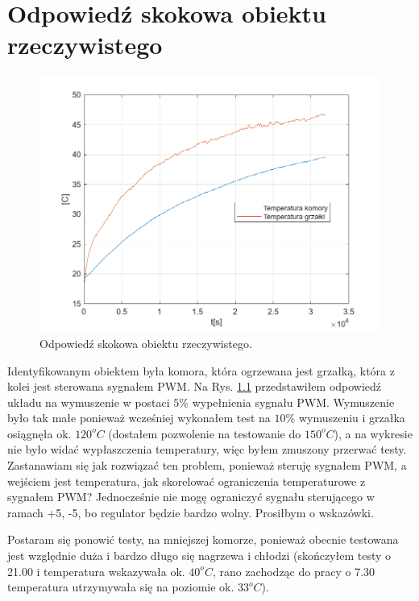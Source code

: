 \chapter{Odpowiedź skokowa obiektu rzeczywistego}

\begin{figure}[h!]
\centering
\includegraphics[width=\textwidth]{pictures/step_response}
\caption{Odpowiedź skokowa obiektu rzeczywistego.}
\label{step_response}
\end{figure}

Identyfikowanym obiektem była komora, która ogrzewana jest grzałką, która z kolei jest sterowana sygnałem PWM. Na Rys. \ref{step_response} przedstawiłem odpowiedź układu na wymuszenie w postaci $5\%$ wypełnienia sygnału PWM. Wymuszenie było tak małe ponieważ wcześniej wykonałem test na $10\%$ wymuszeniu i grzałka osiągnęła ok. $120^oC$ (dostałem pozwolenie na testowanie do $150^oC$), a na wykresie nie było widać wypłaszczenia temperatury, więc byłem zmuszony przerwać testy. Zastanawiam się jak rozwiązać ten problem, ponieważ steruję sygnałem PWM, a wejściem jest temperatura, jak skorelować ograniczenia temperaturowe z sygnałem PWM? Jednocześnie nie mogę ograniczyć sygnału sterującego w ramach +5, -5, bo regulator będzie bardzo wolny. Prosiłbym o wskazówki.

Postaram się ponowić testy, na mniejszej komorze, ponieważ obecnie testowana jest względnie duża i bardzo długo się nagrzewa i chłodzi (skończyłem testy o 21.00 i temperatura wskazywała ok. $40^oC$, rano zachodząc do pracy o 7.30 temperatura utrzymywała się na poziomie ok. $33^oC$).

